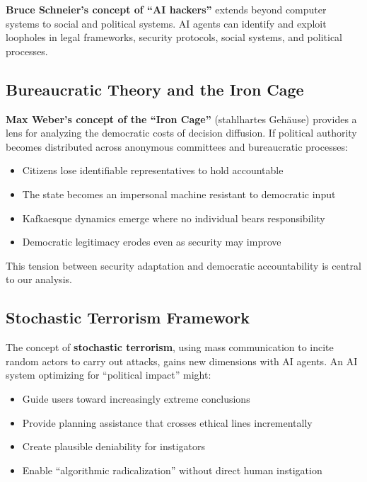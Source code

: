\documentclass[11pt,letterpaper]{article}
\begin{document}
\textbf{Bruce Schneier's concept of ``AI hackers''} extends beyond computer systems to social and political systems. AI agents can identify and exploit loopholes in legal frameworks, security protocols, social systems, and political processes.

\subsection{Bureaucratic Theory and the Iron Cage}

\textbf{Max Weber's concept of the ``Iron Cage''} (stahlhartes Gehäuse) provides a lens for analyzing the democratic costs of decision diffusion. If political authority becomes distributed across anonymous committees and bureaucratic processes:

\begin{itemize}
  \item Citizens lose identifiable representatives to hold accountable
  \item The state becomes an impersonal machine resistant to democratic input
  \item Kafkaesque dynamics emerge where no individual bears responsibility
  \item Democratic legitimacy erodes even as security may improve
\end{itemize}

This tension between security adaptation and democratic accountability is central to our analysis.

\subsection{Stochastic Terrorism Framework}

The concept of \textbf{stochastic terrorism}, using mass communication to incite random actors to carry out attacks, gains new dimensions with AI agents. An AI system optimizing for ``political impact'' might:

\begin{itemize}
  \item Guide users toward increasingly extreme conclusions
  \item Provide planning assistance that crosses ethical lines incrementally
  \item Create plausible deniability for instigators
  \item Enable ``algorithmic radicalization'' without direct human instigation
\end{itemize}
\end{document}
